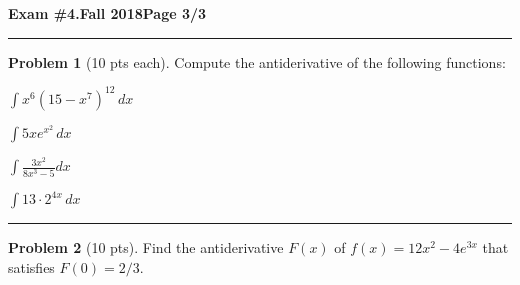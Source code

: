 \documentclass[12pt]{article}
\theoremstyle{definition}
\newtheorem{problem}{Problem}
\begin{document}
\newpage

\hfill{\large\bf Exam \#4.}\hfill{\large\bf Fall 2018}\hfill{\large\bf Page 3/3}\hrule

\bigskip
\begin{problem}[10 pts each]
Compute the antiderivative of the following functions:
\item $\displaystyle{\int x^6 (15 - x^7)^{12}\, dx}$
\vspace{3.5cm}
\item $\displaystyle{\int  5x e^{x^2} \, dx}$
\vspace{3.5cm}
\item $\displaystyle{\int \frac{3x^2}{8x^3-5} dx}$
\vspace{3.5cm}
\item $\displaystyle{\int 13 \cdot 2^{4x}\, dx}$
\vspace{2.5cm}
\end{problem}
\hrule

\begin{problem}[10 pts]
Find the antiderivative $F(x)$ of $f(x)=12x^2 - 4e^{3x}$ that satisfies $F(0)=2/3$.
\end{problem}
\end{document}
